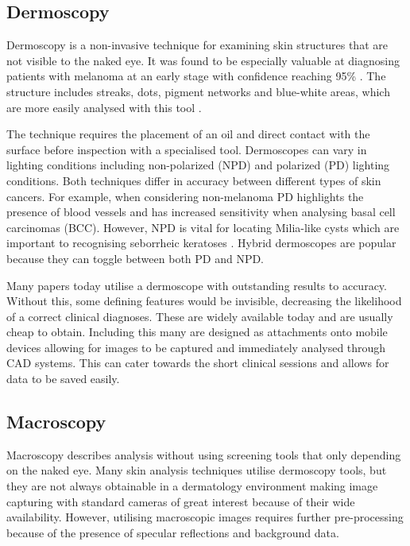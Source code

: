\documentclass[12pt]{report}
\begin{document}
\subsection{Dermoscopy}
Dermoscopy is a non-invasive technique for examining skin structures that are not visible to the naked eye. It was found to be especially valuable at diagnosing patients with melanoma at an early stage \cite{Argenziano2001, Pennisi2016} with confidence reaching 95\% \cite{Thiers2009}. The structure includes streaks, dots, pigment networks and blue-white areas, which are more easily analysed with this tool \cite{Zhou2008, Suer2011}.

The technique requires the placement of an oil and direct contact with the surface before inspection with a specialised tool. Dermoscopes can vary in lighting conditions including non-polarized (NPD) and polarized (PD) lighting conditions. Both techniques differ in accuracy between different types of skin cancers. For example, when considering non-melanoma PD highlights the presence of blood vessels and has increased sensitivity when analysing basal cell carcinomas (BCC). However, NPD is vital for locating Milia-like cysts which are important to recognising seborrheic keratoses \cite{Wang2008}. Hybrid dermoscopes are popular because they can toggle between both PD and NPD.

Many papers today utilise a dermoscope with outstanding results to accuracy\cite{}. Without this, some defining features would be invisible, decreasing the likelihood of a correct clinical diagnoses. These are widely available today and are usually cheap to obtain. Including this many are designed as attachments onto mobile devices allowing for images to be captured and immediately analysed through CAD systems. This can cater towards the short clinical sessions and allows for data to be saved easily.

\subsection{Macroscopy}
Macroscopy describes analysis without using screening tools that only depending on the naked eye. Many skin analysis techniques utilise dermoscopy tools, but they are not always obtainable in a dermatology environment making image capturing with standard cameras of great interest because of their wide availability. However, utilising macroscopic images requires further pre-processing because of the presence of specular reflections \cite{Ramezani2014, Pillay2019} and background data.
\end{document}
